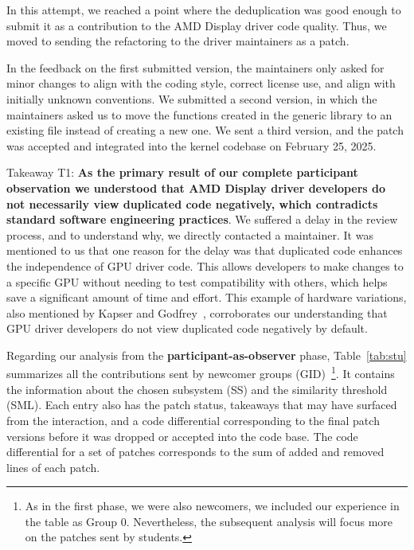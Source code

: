 \documentclass[10pt,conference]{IEEEtran}
\newenvironment{highlight-box}[1]{%
  \begin{tcolorbox}
  \textbf{#1:} \itshape}{\end{tcolorbox}}
\begin{document}
In this attempt, we reached a point where the deduplication was good enough to submit it as a contribution to the AMD Display driver code quality. Thus, we moved to sending the refactoring to the driver maintainers as a patch.

In the feedback on the first submitted version, the maintainers only asked for minor changes to align with the coding style, correct license use, and align with initially unknown conventions. We submitted a second version, in which the maintainers asked us to move the functions created in the generic library to an existing file instead of creating a new one. We sent a third version, and the patch was accepted and integrated into the kernel codebase on February 25, 2025.

\begin{highlight-box}{Takeaway T1:}
  \textbf{As the primary result of our complete participant observation we
  understood that AMD Display driver developers do not necessarily view
  duplicated code negatively, which contradicts standard software engineering
  practices}. We suffered a delay in the review process, and to understand why,
  we directly contacted a maintainer. It was mentioned to us that one reason for
  the delay was that duplicated code enhances the independence of GPU driver
  code. This allows developers to make changes to a specific GPU without needing
  to test compatibility with others, which helps save a significant amount of
  time and effort. This example of hardware variations, also mentioned by Kapser
  and Godfrey~\cite{cloneharm}, corroborates our understanding that GPU driver
  developers do not view duplicated code negatively by default.
\end{highlight-box}

Regarding our analysis from the \textbf{participant-as-observer} phase, Table~\ref{tab:stu} summarizes all the contributions sent by newcomer groups (GID)~\footnote{As in the first phase, we were also newcomers, we included our experience in the table as Group 0. Nevertheless, the subsequent analysis will focus more on the patches sent by students.}. It contains the information about the chosen subsystem (SS) and the similarity threshold (SML). Each entry also has the patch status, takeaways that may have surfaced from the interaction, and a code differential corresponding to the final patch versions before it was dropped or accepted into the code base. The code differential for a set of patches corresponds to the sum of added and removed lines of each patch.
\end{document}
